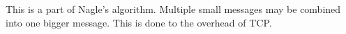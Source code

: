 This is a part of Nagle's algorithm. Multiple small messages may be combined into one bigger message.
This is done to the overhead of TCP.